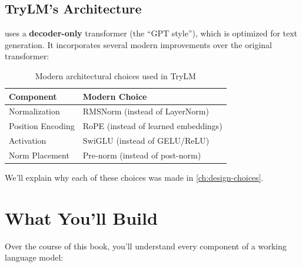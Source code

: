 \subsection{TryLM's Architecture}

\TryLM uses a \textbf{decoder-only} transformer (the ``GPT style''), which is optimized for text generation. It incorporates several modern improvements over the original transformer:

\begin{table}[H]
\centering
\begin{tabular}{ll}
\toprule
\textbf{Component} & \textbf{Modern Choice} \\
\midrule
Normalization & RMSNorm (instead of LayerNorm) \\
Position Encoding & RoPE (instead of learned embeddings) \\
Activation & SwiGLU (instead of GELU/ReLU) \\
Norm Placement & Pre-norm (instead of post-norm) \\
\bottomrule
\end{tabular}
\caption{Modern architectural choices used in TryLM}
\label{tab:architecture-choices}
\end{table}

We'll explain why each of these choices was made in \cref{ch:design-choices}.

\section{What You'll Build}

Over the course of this book, you'll understand every component of a working language model:

